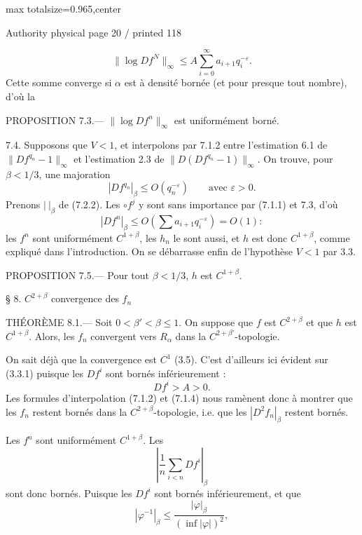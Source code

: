 \documentclass{article}
\begin{document}
\newpage
\noindent\begin{adjustbox}{max totalsize={\textwidth}{0.965\textheight},center}\begin{minipage}{\textwidth}
\noindent\hfill\scriptsize Authority physical page 20 / printed 118\par\normalsize
\[
\tag{7.2.3}
\lVert\log Df^N\rVert_\infty
\leq A\sum_{i=0}^{\infty}a_{i+1}q_i^{-\varepsilon}.
\]
Cette somme converge si \(\alpha\) est à densité bornée (et pour presque tout nombre), d’où la

PROPOSITION 7.3.— \(\lVert\log Df^n\rVert_\infty\) est uniformément borné.

7.4. Supposons que \(V<1\), et interpolons par 7.1.2 entre l’estimation 6.1 de \(\lVert Df^{q_n}-1\rVert_\infty\) et l’estimation 2.3 de \(\lVert D(Df^{q_n}-1)\rVert_\infty\). On trouve, pour \(\beta<1/3\), une majoration
\[
\tag{7.4.1}
|Df^{q_n}|_\beta\leq O(q_n^{-\varepsilon})
\qquad\text{avec }\varepsilon>0.
\]
Prenons \(|\ |_{\beta}\) de (7.2.2). Les \(\circ f^j\) y sont sans importance par (7.1.1) et 7.3, d’où
\[
|Df^n|_\beta\leq O\!\left(\sum a_{i+1}q_i^{-\varepsilon}\right)=O(1):
\]
les \(f^n\) sont uniformément \(C^{1+\beta}\), les \(h_n\) le sont aussi, et \(h\) est donc \(C^{1+\beta}\), comme expliqué dans l’introduction. On se débarrasse enfin de l’hypothèse \(V<1\) par 3.3.

PROPOSITION 7.5.— Pour tout \(\beta<1/3\), \(h\) est \(C^{1+\beta}\).

§ 8. \(C^{2+\beta}\) convergence des \(f_n\)

THÉORÈME 8.1.— Soit \(0<\beta'<\beta\leq1\). On suppose que \(f\) est \(C^{2+\beta}\) et que \(h\) est \(C^{1+\beta}\). Alors, les \(f_n\) convergent vers \(R_\alpha\) dans la \(C^{2+\beta'}\)-topologie.

On sait déjà que la convergence est \(C^1\) (3.5). C’est d’ailleurs ici évident sur (3.3.1) puisque les \(Df^i\) sont bornés inférieurement :
\[
Df^i>A>0.
\]
Les formules d’interpolation (7.1.2) et (7.1.4) nous ramènent donc à montrer que les \(f_n\) restent bornés dans la \(C^{2+\beta}\)-topologie, i.e. que les \(|D^2f_n|_\beta\) restent bornés.

Les \(f^n\) sont uniformément \(C^{1+\beta}\). Les
\[
\left|\frac1n\sum_{i<n}Df^i\right|_\beta
\]
sont donc bornés. Puisque les \(Df^i\) sont bornés inférieurement, et que
\[
|\varphi^{-1}|_\beta\leq\frac{|\varphi|_\beta}{(\inf|\varphi|)^2},
\]
\end{minipage}\end{adjustbox}
\end{document}
